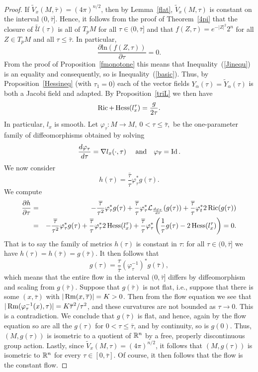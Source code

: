 \begin{proof}\sketch
{}
If $\widetilde V_x(M,\bar\tau)=(4\pi)^{n/2}$, then by
Lemma~\ref{flat}, $\widetilde V_x(M,\tau)$ is constant on the
interval $(0,\bar\tau]$. Hence, it follows from the proof of
Theorem~\ref{4pi} that the closure of $\widetilde{\mathcal U}(\tau)$
is all of $T_pM$ for all $\tau\in (0,\bar\tau]$ and that
$f(Z,\tau)=e^{-|Z|^2}2^n$ for all $Z\in T_pM$ and all $\tau\le
\bar\tau$. In particular,
$$\frac{\partial \mathrm{ln}(f(Z,\tau))}{\partial \tau}=0.$$
From the proof of
 Proposition~\ref{fmonotone} this means that
Inequality~(\ref{Jinequ}) is an equality and consequently, so is
Inequality~(\ref{basic}). Thus, by Proposition~\ref{Hessineq}
 (with $\tau_1=0$) each of the vector fields $Y_\alpha(\tau)=\tilde
Y_\alpha(\tau)$ is both a Jacobi field and adapted. By
Proposition~\ref{triL} we then have
$$\operatorname{Ric}+\operatorname{Hess}(l^\tau_x)=\frac{g}{2\tau}.$$
In particular, $l_x$ is smooth. Let $\varphi_\tau\colon M\to M,\
0<\tau\le \bar\tau$,\ be the one-parameter family of diffeomorphisms
obtained by solving
$$\frac{d\varphi_\tau}{d\tau}=\nabla
l_x(\cdot,\tau)\ \ \ \ \mathrm{and} \ \ \ \varphi_{\bar\tau}=\Id.$$ We now consider
$$h(\tau)=\frac{\bar\tau}{\tau}\varphi_\tau^*g(\tau).$$
We compute \begin{eqnarray*}\frac{\partial h}{\partial \tau} & = &
-\frac{\overline\tau}{\tau^2}\varphi_\tau^*g(\tau)
+\frac{\overline\tau}{\tau}\varphi_\tau^*{\mathcal
L}_{\frac{d\varphi_\tau}{d\tau}}(g(\tau))
+\frac{\overline\tau}{\tau}\varphi_t^*2\operatorname{Ric}(g(\tau)) \\
& = & -\frac{\overline\tau}{\tau^2}\varphi_\tau^*g(\tau) +
\frac{\overline\tau}{\tau}\varphi_\tau^*2\operatorname{Hess}(l_x^\tau)+\frac{\overline\tau}{\tau}
\varphi_\tau^*\left(\frac{1}{\tau}g(\tau)-2\operatorname{Hess}(l_x^\tau)\right)=0.\end{eqnarray*} That is to say the family
of metrics $h(\tau)$ is  constant in $\tau$: for all $\tau\in
(0,\bar\tau]$ we have $h(\tau)=h(\bar\tau)=g(\bar\tau)$. It then
follows that
$$g(\tau)=\frac{\tau}{\bar\tau}(\varphi_\tau^{-1})^*g(\bar\tau),$$
which means that the entire flow in the interval $(0,\bar\tau]$
differs by diffeomorphism and scaling from $g(\bar\tau)$. Suppose
that $g(\bar\tau)$ is not flat, i.e., suppose that there is some
$(x,\bar\tau)$ with $|\operatorname{Rm}(x,\overline\tau)|=K>0$. Then from the flow
equation we see that $|\operatorname{Rm}(\varphi^{-1}_\tau(x),\tau)|=K\overline\tau^2/\tau^2$, and these
curvatures are not bounded as $\tau\rightarrow 0$. This is a
contradiction. We conclude that $g(\bar\tau)$ is flat, and hence,
again by the flow equation so are all the $g(\tau)$ for $0<\tau\le
\bar\tau$, and by continuity, so is $g(0)$. Thus, $(M,g(\tau))$ is
isometric to a quotient of $\mathbb{R}^n$ by a free, properly discontinuous
group action. Lastly, since $\widetilde V_x(M,\tau)=(4\pi)^{n/2}$,
it follows that $(M,g(\tau))$ is isometric to $\mathbb{R}^n$ for every
$\tau\in [0,\bar\tau]$. Of course, it then follows that the flow is
the constant flow.
\end{proof}
